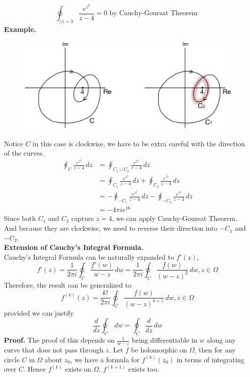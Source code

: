 \documentclass[11pt]{article}
\begin{document}
$$ \oint_{|z| = 3} \frac{e^{z^2}}{z - 4} = 0 \text{ by Cauchy-Goursat Theorem }$$
\textbf{Example.}
\begin{figure}[H]
\includegraphics[scale = 0.2]{13_6}
\centering
\end{figure} 
Notice $C$ in this case is clockwise, we have to be extra careful with the direction of the curves. 
\begin{align*}
\oint_{C}\frac{e^{z^2}}{z - 4} \, dz&= \oint_{C_1\cup C_2}\frac{e^{z^2}}{z - 4} \, dz \\
&= \oint_{C_1}\frac{e^{z^2}}{z - 4}\, dz + \oint_{C_2}\frac{e^{z^2}}{z - 4}\, dz \\
&= -\oint_{-C_1}\frac{e^{z^2}}{z - 4}\, dz - \oint_{-C_2}\frac{e^{z^2}}{z - 4}\, dz \\
&= -4\pi i e^{16}
\end{align*}
Since both $C_1$ and $C_2$ capture $z = 4$, we can apply Cauchy-Goursat Theorem. And because they are clockwise, we need to reverse their direction into $-C_1$ and $-C_2$. \\
\newline
\textbf{Extension of Cauchy's Integral Formula.} \\
Cauchy's Integral Formula can be naturally expanded to $f'(z)$, 
$$ f'(z) = \frac{1}{2\pi i}\oint_C \frac{f'(w)}{w - z} \, dw = \frac{1}{2\pi i}\oint_C \frac{f(w)}{(w - z)^2} \, dw, z \in \Omega$$
Therefore, the result can be generalized to 
$$f^{(k)}(z) = \frac{k!}{2\pi i}\oint_C \frac{f(w)}{(w - z)^{k + 1}} \, dw, z \in \Omega$$
provided we can justify 
$$\frac{d}{dz} \oint_C \,dw = \oint_C \frac{d}{dz} \, dw$$
\textbf{Proof.} The proof of this depends on $\frac{1}{w - z}$ being differentiable in $w$ along any curve that does not pass through $z$. 
Let $f$ be holomorphic on $\Omega$, then for any circle $C$ in $\Omega$ about $z_0$, we have a formula for $f^{(k)}(z_0)$ in terms of integrating over $C$. Hence $f^{(k)}$ exists on $\Omega$, $f^{(k + 1)}$ exists too. 
\end{document}
